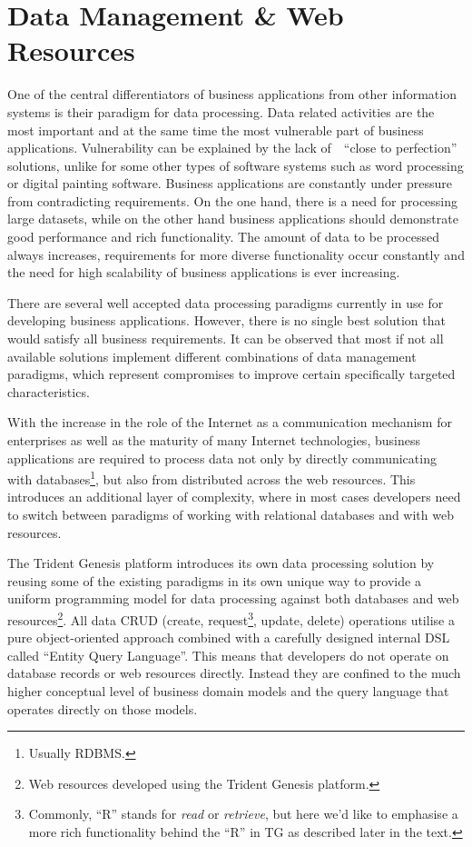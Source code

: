 \section{Data Management \& Web Resources}\label{sec:04}

  One of the central differentiators of business applications from other information systems is their paradigm for data processing.
  Data related activities are the most important and at the same time the most vulnerable part of business applications.
  Vulnerability can be explained by the lack of~~``close to perfection'' solutions, unlike for some other types of software systems such as word processing or digital painting software.
  Business applications are constantly under pressure from contradicting requirements.
  On the one hand, there is a need for processing large datasets, while on the other hand business applications should demonstrate good performance and rich functionality.
  The amount of data to be processed always increases, requirements for more diverse functionality occur constantly and the need for high scalability of business applications is ever increasing.
  
  There are several well accepted data processing paradigms currently in use for developing business applications.
  However, there is no single best solution that would satisfy all business requirements.
  It can be observed that most if not all available solutions implement different combinations of data management paradigms, which represent compromises to improve certain specifically targeted characteristics.

  With the increase in the role of the Internet as a communication mechanism for enterprises as well as the maturity of many Internet technologies, business applications are required to process data not only by directly communicating with databases\footnote{Usually RDBMS.}, but also from distributed across the web resources.
  This introduces an additional layer of complexity, where in most cases developers need to switch between paradigms of working with relational databases and with web resources.

  The Trident Genesis platform introduces its own data processing solution by reusing some of the existing paradigms in its own unique way to provide a uniform programming model for data processing against both databases and web resources\footnote{Web resources developed using the Trident Genesis platform.}.
  All data CRUD (create, request\footnote{Commonly, ``R'' stands for \emph{read} or \emph{retrieve}, but here we'd like to emphasise a more rich functionality behind the ``R'' in TG as described later in the text.}, update, delete) operations utilise a pure object-oriented approach combined with a carefully designed internal DSL called ``Entity Query Language''.
  This means that developers do not operate on database records or web resources directly.
  Instead they are confined to the much higher conceptual level of business domain models and the query language that operates directly on those models.
  
